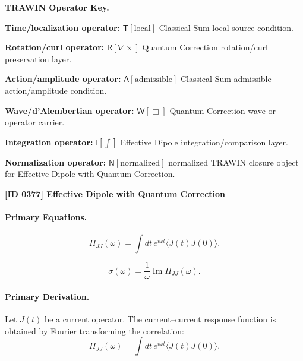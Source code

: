 \par\vspace{0.45\baselineskip}
\noindent\begin{minipage}[t]{\linewidth}
\begingroup
\small
\raggedright
\textbf{TRAWIN Operator Key.}\par
\noindent\textbf{Time/localization operator:} $\mathsf{T}\!\left[\mathrm{local}\right]$ Classical Sum local source condition.\par
\noindent\textbf{Rotation/curl operator:} $\mathsf{R}\!\left[\nabla\times\right]$ Quantum Correction rotation/curl preservation layer.\par
\noindent\textbf{Action/amplitude operator:} $\mathsf{A}\!\left[\mathrm{admissible}\right]$ Classical Sum admissible action/amplitude condition.\par
\noindent\textbf{Wave/d'Alembertian operator:} $\mathsf{W}\!\left[\Box\right]$ Quantum Correction wave or operator carrier.\par
\noindent\textbf{Integration operator:} $\mathsf{I}\!\left[\int\right]$ Effective Dipole integration/comparison layer.\par
\noindent\textbf{Normalization operator:} $\mathsf{N}\!\left[\mathrm{normalized}\right]$ normalized TRAWIN closure object for Effective Dipole with Quantum Correction.\par
\endgroup
\end{minipage}

\clearpage
\noindent\textbf{[ID 0377] Effective Dipole with Quantum Correction}\par
\vspace{0.35em}
\paragraph{Primary Equations.}
\begin{equation}
\Pi_{JJ}(\omega)
=
\int
dt\,
e^{i\omega t}
\langle J(t)J(0)\rangle .
\end{equation}

\begin{equation}
\sigma(\omega)
=
\frac{1}{\omega}
\operatorname{Im}\Pi_{JJ}(\omega).
\end{equation}

\paragraph{Primary Derivation.}
Let $J(t)$ be a current operator.  
The current--current response function is obtained by Fourier transforming the correlation:
\begin{equation}
\Pi_{JJ}(\omega)
=
\int
dt\,
e^{i\omega t}
\langle J(t)J(0)\rangle .
\end{equation}

